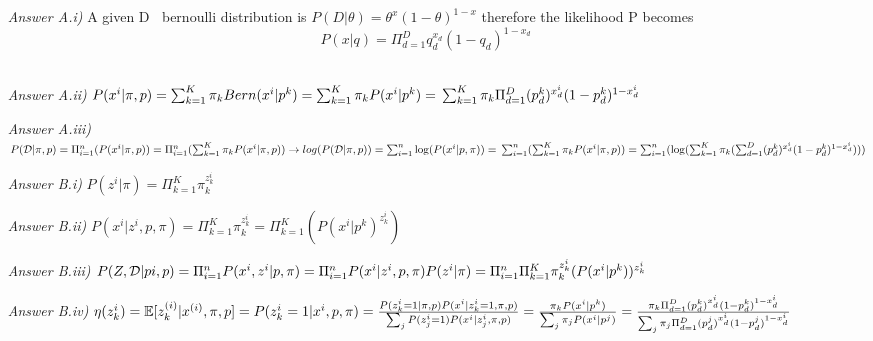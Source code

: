 \documentclass{article}
\theoremstyle{definition}
\theoremstyle{remark}
\begin{document}
	
	\begin{enumerate}[font={\Large\bfseries}]
         
		\begin{itemize}
			\item[\textit{Answer A.i)}] A given D $~$ bernoulli distribution is $P(D|\theta) =\theta^x(1-\theta)^{1-x}$ therefore the likelihood P becomes 
			$$P(x|q) = \Pi_{d=1}^D q_d^{x_d}(1-q_d)^{1-x_d}$$\\
			
			\item[\textit{Answer A.ii)}] {$P(x^i |\pi,p) = \sum_{k=1}^K \pi_k Bern(x^i | p^k) = \sum_{k=1}^K \pi_k P(x^i|p^k) =\\
			 \sum_{k=1}^K \pi_k \Pi_{d=1}^D (p_{d}^{k})^{x_{d}^{i}}(1-p_{d}^{k})^{1-x_{d}^{i}}$}\\
		
			\item[\textit{Answer A.iii)}] $P(\mathcal{D}|\pi,p) = 
			\Pi_{i=1}^n(P(x^i|\pi,p)) = 
			\Pi_{i=1}^n(\sum_{k=1}^K\pi_k P(x^i|\pi,p)) \rightarrow \\
			log(P(\mathcal{D}|\pi,p)) = 
			\sum_{i=1}^n \log(P(x^i|p,\pi)) = 
			\\\sum_{i=1}^n(\sum_{k=1}^K\pi_k P(x^i|\pi,p)) = 
			\sum_{i=1}^n(\log(\sum_{k=1}^K\pi_k (\sum_{d=1}^D (p_{d}^{k})^{x_{d}^{i}}(1-p_{d}^{k})^{1-x_{d}^{i}})))$\\

			\item[\textit{Answer B.i)}] $P(z^i| \pi) = \Pi_{k=1}^K \pi_k^{z_k^i}$\\

			\item[\textit{Answer B.ii)}] $P(x^i|z^i,p,\pi) = \Pi_{k=1}^K \pi_k^{z_k^i} = \Pi_{k=1}^K (P(x^i|p^k)^{z_k^i})$\\
			
			\item[\textit{Answer B.iii)}] $P(Z,\mathcal{D}|pi,p) = \Pi^n_{i=1} P(x^i,z^i| p, \pi) = \Pi^n_{i=1} P(x^i|z^i, p, \pi)P(z^i|\pi) =\\ 
			\Pi^n_{i=1} \Pi^K_{k=1} \pi_k^{z_k^i} (P(x^i|p^k))^{z_k^i}$\\

			\item[\textit{Answer B.iv)}] $\eta(z_k^i) = 
			\mathbb{E} [z_{k}^{(i)}| x^{(i)},\pi,p] = 
			P(z_k^i=1|x^i,p,\pi) = 
			\frac{P(z^i_k=1|\pi,p)P(x^i|z^i_k=1,\pi,p)}{\sum_{j} P(z^i_{j}=1)P(x^i|z^i_{j},\pi,p)} = \\
			\frac{\pi_kP(x^i|p^k)}{\sum_j \pi_jP(x^i|p^j)} = 
			\frac{\pi_k \Pi_{d=1}^D (p_{d}^{k})^{x_{d}^{i}}(1-p_{d}^{k})^{1-x_{d}^{i}}}{\sum_j \pi_j \Pi_{d=1}^D (p_{d}^{j})^{x_{d}^{i}}(1-p_{d}^{j})^{1-x_{d}^{i}}}$\\


\end{itemize}
\end{enumerate}
\end{document}
